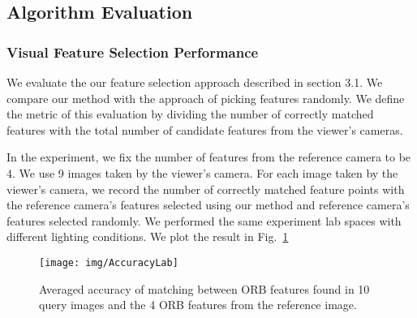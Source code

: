 \begin{table}[!thb]
\centering
\footnotesize
{}
\caption{CPU and memory usage of Smartphone}
\label{tab:cpu_mem_usage_sp}
\end{table}
\vspace{-0.5cm}


\subsection{Algorithm Evaluation}
\subsubsection{Visual Feature Selection Performance}

We evaluate the our feature selection approach described in section 3.1. We compare our method with the approach of picking features randomly. We define the metric of this evaluation by dividing the number of correctly matched features with the total number of candidate features from the viewer's cameras.

In the experiment, we fix the number of features from the reference camera to be 4. We use 9 images taken by the viewer's camera. For each image taken by the viewer's camera, we record the number of correctly matched feature points with the reference camera's features selected using our method and reference camera's features selected randomly. We performed the same experiment  lab spaces with different lighting conditions. We plot the result in Fig.~\ref{fig:feature_accuracy}

\begin{figure}[!htb]
	\begin{center}
		\texttt{[image: img/AccuracyLab]}
		\caption{Averaged accuracy of matching between ORB features found in 10 query images and the 4 ORB features from the reference image.}
		\label{fig:feature_accuracy}
	\end{center}
	\vspace{-1.5em}
\end{figure}

